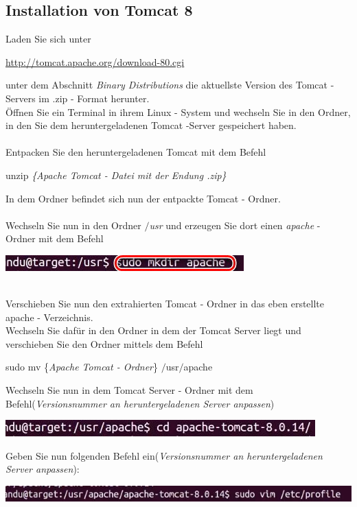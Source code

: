 \documentclass[a4paper, 12pt]{scrreprt}
\begin{document}
\subsection{Installation von Tomcat 8}
Laden Sie sich unter 
\begin{center}
	\url{http://tomcat.apache.org/download-80.cgi}
\end{center}
unter dem Abschnitt {\it Binary Distributions} die aktuellste Version des Tomcat - Servers im .zip - Format herunter.\\
Öffnen Sie ein Terminal in ihrem Linux - System und wechseln Sie in den Ordner, in den Sie dem heruntergeladenen Tomcat -Server gespeichert haben.\\
\ \\
Entpacken Sie den heruntergeladenen Tomcat mit dem Befehl
\begin{center}
	unzip  {\it \{Apache Tomcat - Datei mit der Endung .zip\} }
\end{center}
In dem Ordner befindet sich nun der entpackte Tomcat - Ordner.\\
\ \\
Wechseln Sie nun in den Ordner {\it $/$usr} und erzeugen Sie dort einen {\it apache} - Ordner mit dem Befehl
\begin{center}
\includegraphics[width=0.5\linewidth]{Grafiken/apache_linux_path}
\end{center}
\ \\
Verschieben Sie nun den extrahierten Tomcat - Ordner in das eben erstellte apache - Verzeichnis.\\
Wechseln Sie dafür in den Ordner in dem der Tomcat Server liegt und verschieben Sie den Ordner mittels dem Befehl
\begin{center}
	sudo mv \{{\it Apache Tomcat - Ordner}\} $/$usr$/$apache
\end{center}
Wechseln Sie nun in dem Tomcat Server - Ordner mit dem Befehl({\it Versionsnummer an heruntergeladenen Server anpassen})
\begin{center}
\includegraphics[width=0.65\linewidth]{Grafiken/wechseln_server_ordner}
\end{center}
Geben Sie nun folgenden Befehl ein({\it Versionsnummer an heruntergeladenen Server anpassen}):
\begin{center}
\includegraphics[width=0.9\linewidth]{Grafiken/Befhel}
\end{center}
\end{document}
